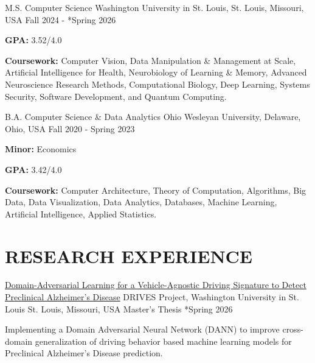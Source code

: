 \documentclass[10pt, letterpaper]{article}
\begin{document}
\begin{educationentry}
  {M.S. Computer Science} %
  {Washington University in St. Louis, St. Louis, Missouri, USA} %
  {Fall 2024 - *Spring 2026} %
  \item \textbf{GPA:} 3.52/4.0
  \item \textbf{Coursework:}  Computer Vision, Data Manipulation \& Management at Scale, Artificial Intelligence for Health, Neurobiology of Learning \& Memory, Advanced Neuroscience Research Methods, Computational Biology, Deep Learning, Systems Security, Software Development, and Quantum Computing.
\end{educationentry}

\begin{educationentry}
  {B.A. Computer Science \& Data Analytics} %
  {Ohio Wesleyan University, Delaware, Ohio, USA} %
  {Fall 2020 - Spring 2023} %
  \item \textbf{Minor:} Economics
  \item \textbf{GPA:} 3.42/4.0
  \item \textbf{Coursework:} Computer Architecture, Theory of Computation, Algorithms, Big Data, Data Visualization, Data Analytics, Databases, Machine Learning, Artificial Intelligence, Applied Statistics.
\end{educationentry}

\vspace{\headerSpacing}

\section{RESEARCH EXPERIENCE}

\begin{researchentry}
  {\href{}{Domain-Adversarial Learning for a Vehicle-Agnostic Driving Signature to Detect Preclinical Alzheimer's Disease}} %
  {DRIVES Project, Washington University in St. Louis} %
  {St. Louis, Missouri, USA} %
  {Master's Thesis} %
  {*Spring 2026} %
  \item Implementing a Domain Adversarial Neural Network (DANN) to improve cross-domain generalization of driving behavior based machine learning models for Preclinical Alzheimer's Disease prediction.
\end{researchentry}
\end{document}
